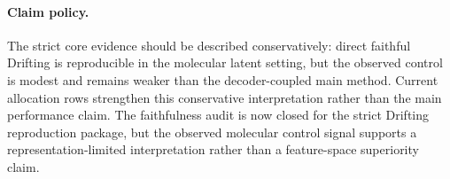 \begin{table}[!h]
\centering
\caption{Positive/negative allocation sweep for faithful Drifting. Allocation
improves diversity more reliably than QED target tracking.}
\label{tab:supp-faithful-allocation}
\end{table}

\paragraph{Claim policy.}
The strict core evidence should be described conservatively: direct faithful
Drifting is reproducible in the molecular latent setting, but the observed
control is modest and remains weaker than the decoder-coupled main method.
Current allocation rows strengthen this conservative interpretation rather
than the main performance claim. The faithfulness audit is now closed for the
strict Drifting reproduction package, but the observed molecular control signal
supports a representation-limited interpretation rather than a feature-space
superiority claim.
